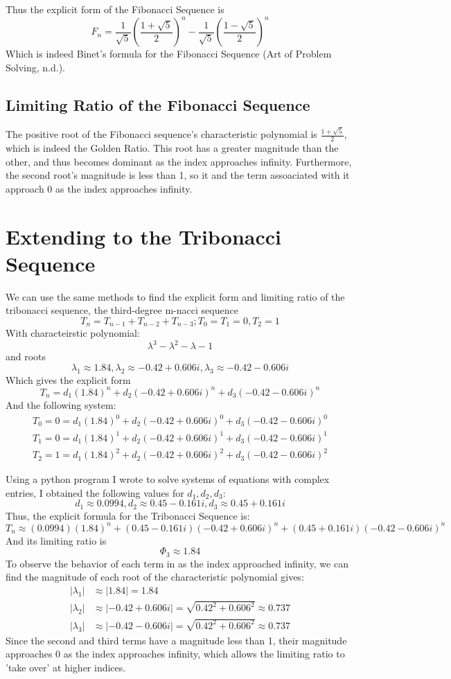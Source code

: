 \documentclass[11pt]{article}
\begin{document}
Thus the explicit form of the Fibonacci Sequence is
    \[F_n=\frac{1}{\sqrt{5}}\left(\frac{1+\sqrt{5}}{2}\right)^n-\frac{1}{\sqrt{5}}\left(\frac{1-\sqrt{5}}{2}\right)^n\]
Which is indeed Binet's formula for the Fibonacci Sequence (Art of Problem Solving, n.d.).

\subsection{Limiting Ratio of the Fibonacci Sequence}
The positive root of the Fibonacci sequence's characteristic polynomial is $\frac{1+\sqrt{5}}{2}$, which is indeed the Golden Ratio. This root has a greater magnitude than the other, and thus becomes dominant as the index approaches infinity. Furthermore, the second root's magnitude is less than 1, so it and the term assoaciated with it approach 0 as the index approaches infinity.  



\section{Extending to the Tribonacci Sequence}
We can use the same methods to find the explicit form and limiting ratio of the tribonacci sequence, the third-degree m-nacci sequence
$$T_n=T_{n-1}+T_{n-2}+T_{n-3};T_0=T_1=0, T_2=1$$
With characteirstic polynomial:
\[\lambda^3-\lambda^2-\lambda-1\]
and roots
\[\lambda_1 \approx 1.84, \lambda_2 \approx -0.42 + 0.606i, \lambda_3 \approx -0.42 - 0.606i\]
Which gives the explicit form
\[T_n=d_1(1.84)^n+d_2(-0.42 + 0.606i)^n+d_3(-0.42 - 0.606i)^n\]
And the following system:
\begin{align*}
    T_0=0=d_1(1.84)^0+d_2(-0.42 + 0.606i)^0+d_3(-0.42 - 0.606i)^0 \\
    T_1=0=d_1(1.84)^1+d_2(-0.42 + 0.606i)^1+d_3(-0.42 - 0.606i)^1 \\
    T_2=1=d_1(1.84)^2+d_2(-0.42 + 0.606i)^2+d_3(-0.42 - 0.606i)^2
\end{align*}

Using a python program I wrote to solve systems of equations with complex entries, I obtained the following values for $d_1,d_2,d_3$:
\[d_1\approx0.0994,d_2\approx0.45-0.161i,d_3\approx0.45+0.161i\]
Thus, the explicit formula for the Tribonacci Sequence is:
\[T_n\approx(0.0994)(1.84)^n+(0.45-0.161i)(-0.42 + 0.606i)^n+(0.45+0.161i)(-0.42 - 0.606i)^n\]
And its limiting ratio is \[\Phi_3\approx1.84\]
To observe the behavior of each term in as the index approached infinity, we can find the magnitude of each root of the characteristic polynomial gives: 
\begin{align*}
    |\lambda_1|&\approx|1.84|=1.84 \\
    |\lambda_2|&\approx|-0.42 + 0.606i|=\sqrt{0.42^2+0.606^2}\approx 0.737\\
    |\lambda_3|&\approx|-0.42 - 0.606i|=\sqrt{0.42^2+0.606^2}\approx 0.737
\end{align*}
Since the second and third terms have a magnitude less than 1, their magnitude approaches 0 as the index approaches infinity, which allows the limiting ratio to 'take over' at higher indices. 
\end{document}
